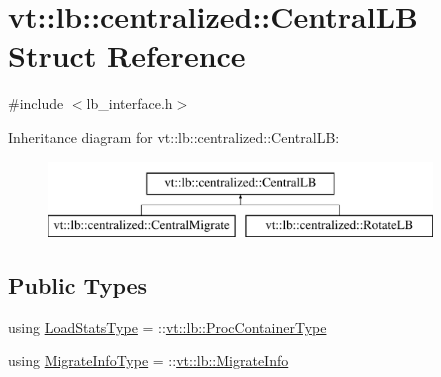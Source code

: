 \hypertarget{structvt_1_1lb_1_1centralized_1_1_central_l_b}{}\section{vt\+:\+:lb\+:\+:centralized\+:\+:Central\+LB Struct Reference}
\label{structvt_1_1lb_1_1centralized_1_1_central_l_b}


{\ttfamily \#include $<$lb\+\_\+interface.\+h$>$}

Inheritance diagram for vt\+:\+:lb\+:\+:centralized\+:\+:Central\+LB\+:\begin{figure}[H]
\begin{center}
\leavevmode
\includegraphics[height=2.000000cm]{structvt_1_1lb_1_1centralized_1_1_central_l_b}
\end{center}
\end{figure}
\subsection*{Public Types}
\begin{DoxyCompactItemize}
\item 
using \hyperlink{structvt_1_1lb_1_1centralized_1_1_central_l_b_aafbf9d4fbe90a3561fd812661c970b2d}{Load\+Stats\+Type} = \+::\hyperlink{namespacevt_1_1lb_af7c6ee21a7b3966b7ab64c5b626d30f8}{vt\+::lb\+::\+Proc\+Container\+Type}
\item 
using \hyperlink{structvt_1_1lb_1_1centralized_1_1_central_l_b_a8d393c0126180fb8cce2b881c23df44f}{Migrate\+Info\+Type} = \+::\hyperlink{structvt_1_1lb_1_1_migrate_info}{vt\+::lb\+::\+Migrate\+Info}
\end{DoxyCompactItemize}
